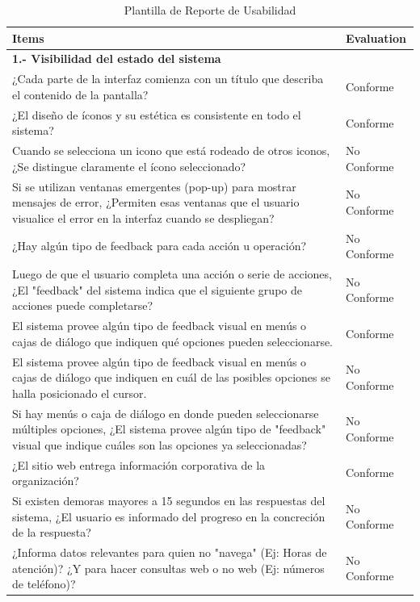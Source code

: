 \documentclass[stu, 12pt, letterpaper, donotrepeattitle, floatsintext, natbib]{apa7}
\begin{document}
\begin{longtable}{|>{\raggedright\arraybackslash}p{10cm}|>{\centering\arraybackslash}p{3cm}|}
    \caption{Plantilla de Reporte de Usabilidad} \label{tab:reporte_usabilidad} \\
    \hline
    \textbf{Items} & \textbf{Evaluation} \\ \hline
    
    \textbf{1.- Visibilidad del estado del sistema} & \\ \hline
    ¿Cada parte de la interfaz comienza con un título que describa el contenido de la pantalla? & Conforme \\ \hline
    ¿El diseño de íconos y su estética es consistente en todo el sistema? & Conforme \\ \hline
    Cuando se selecciona un icono que está rodeado de otros iconos, ¿Se distingue claramente el ícono seleccionado? & No Conforme \\ \hline
    Si se utilizan ventanas emergentes (pop-up) para mostrar mensajes de error, ¿Permiten esas ventanas que el usuario visualice el error en la interfaz cuando se despliegan? & No Conforme\\ \hline
    ¿Hay algún tipo de feedback para cada acción u operación? & No Conforme\\ \hline
    Luego de que el usuario completa una acción o serie de acciones, ¿El "feedback" del sistema indica que el siguiente grupo de acciones puede completarse? & No Conforme\\ \hline
    El sistema provee algún tipo de feedback visual en menús o cajas de diálogo que indiquen qué opciones pueden seleccionarse. & Conforme \\ \hline
    El sistema provee algún tipo de feedback visual en menús o cajas de diálogo que indiquen en cuál de las posibles opciones se halla posicionado el cursor. & No Conforme \\ \hline
    Si hay menús o caja de diálogo en donde pueden seleccionarse múltiples opciones, ¿El sistema provee algún tipo de "feedback" visual que indique cuáles son las opciones ya seleccionadas? & No Conforme \\ \hline
    ¿El sitio web entrega información corporativa de la organización? & Conforme \\ \hline
    Si existen demoras mayores a 15 segundos en las respuestas del sistema, ¿El usuario es informado del progreso en la concreción de la respuesta? & No Conforme \\ \hline
    ¿Informa datos relevantes para quien no "navega" (Ej: Horas de atención)? ¿Y para hacer consultas web o no web (Ej: números de teléfono)? & No Conforme \\ \hline

\end{longtable}
\end{document}
